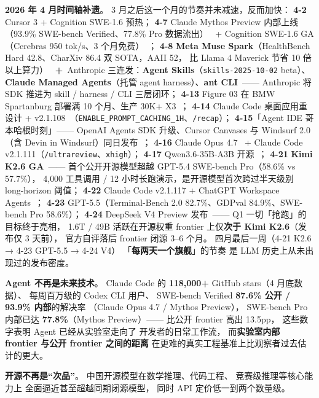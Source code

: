\textbf{2026 年 4 月时间轴补遗}。
3 月之后这一个月的节奏并未减速，反而加快：
\textbf{4-2} Cursor 3 + Cognition SWE-1.6 预热；
\textbf{4-7} Claude Mythos Preview 内部上线（93.9\% SWE-bench Verified、77.8\% Pro 数据流出）~\cite{anthropicmythos,anthropicglasswing2026}
+ Cognition SWE-1.6 GA（Cerebras 950 tok/s、3 个月免费）~\cite{cognitionswe16}；
\textbf{4-8} \textbf{Meta Muse Spark}（HealthBench Hard 42.8、CharXiv 86.4 双 SOTA，AAII 52，
比 Llama 4 Maverick 节省 10 倍以上算力）~\cite{metamuse2026}
\textbf{+}\ Anthropic 三连发：\textbf{Agent Skills}（\texttt{skills-2025-10-02} beta）、
\textbf{Claude Managed Agents}（托管 agent harness）、\textbf{ant CLI}~\cite{anthropicapril8}——
Anthropic 将 SDK 推进为 skill / harness / CLI 三层闭环；
\textbf{4-13} Figure 03 在 BMW Spartanburg 部署满 10 个月、生产 30K+ X3~\cite{figure032026}；
\textbf{4-14} Claude Code 桌面应用重设计 + v2.1.108~\cite{claudecodev21x}（\texttt{ENABLE\_PROMPT\_CACHING\_1H}、\texttt{/recap}）；
\textbf{4-15}「Agent IDE 哥本哈根时刻」——
OpenAI Agents SDK 升级、Cursor Canvases 与 Windsurf 2.0（含 Devin in Windsurf）同日发布~\cite{windsurf2devin}；
\textbf{4-16} Claude Opus 4.7~\cite{anthropicopus47} + Claude Code v2.1.111（\texttt{/ultrareview}、\texttt{xhigh}）；
\textbf{4-17} Qwen3.6-35B-A3B 开源~\cite{qwen36moe}；
\textbf{4-21} \textbf{Kimi K2.6 GA}~\cite{moonshotk26}——
首个公开开源模型超越 GPT-5.4 SWE-bench Pro（58.6\% vs 57.7\%），
4{,}000 工具调用 / 12 小时长跑演示，是开源模型首次跨过半天级别 long-horizon 阈值；
\textbf{4-22} Claude Code v2.1.117 + ChatGPT Workspace Agents~\cite{openaigpt54}；
\textbf{4-23} GPT-5.5（Terminal-Bench 2.0 82.7\%、GDPval 84.9\%、SWE-bench Pro 58.6\%）；
\textbf{4-24} DeepSeek V4 Preview 发布~\cite{deepseekv4,artificialanalysisv4}——
Q1 一切「抢跑」的目标终于亮相，
1.6T / 49B 活跃在开源权重 frontier 上仅\textbf{次于 Kimi K2.6}（发布仅 3 天前），
官方自评落后 frontier 闭源 3--6 个月。
四月最后一周（4-21 K2.6 → 4-23 GPT-5.5 → 4-24 V4）
「\textbf{每两天一个旗舰}」的节奏
是 LLM 历史上从未出现过的发布密度。

\textbf{Agent 不再是未来技术}。
Claude Code 的 \textbf{118,000+} GitHub stars（4 月底数据）、
每周百万级的 Codex CLI 用户、
SWE-bench Verified \textbf{87.6\% 公开 / 93.9\% 内部}的解决率
（Claude Opus 4.7 / Mythos Preview），
SWE-bench Pro 内部已达 \textbf{77.8\%}（Mythos Preview）——
比公开 frontier 高出 13.5pp，
这些数字表明 Agent 已经从实验室走向了
开发者的日常工作流，
而\textbf{实验室内部 frontier 与公开 frontier 之间的距离}
在更难的真实工程基准上比观察者过去估计的更大。

\textbf{开源不再是“次品”}。
中国开源模型在数学推理、代码工程、
竞赛级推理等核心能力上
全面逼近甚至超越同期闭源模型，
同时 API 定价低一到两个数量级。

